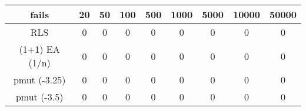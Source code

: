 \begin{tabular}[h]{ccccccccc}
fails&20&50&100&500&1000&5000&10000&50000\\\hline
RLS&0&0&0&0&0&0&0&0\\
(1+1) EA (1/n)&0&0&0&0&0&0&0&0\\
pmut (-3.25)&0&0&0&0&0&0&0&0\\
pmut (-3.5)&0&0&0&0&0&0&0&0\\
\end{tabular}

